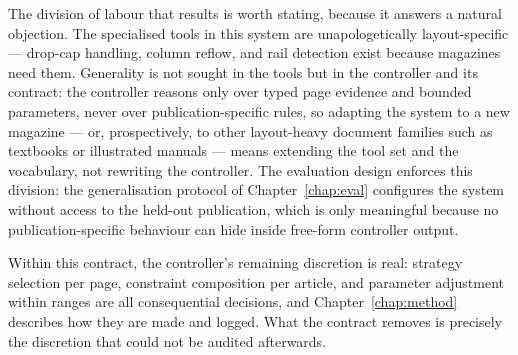 The division of labour that results is worth stating, because it
answers a natural objection. The specialised tools in this system are
unapologetically layout-specific --- drop-cap handling, column reflow,
and rail detection exist because magazines need them. Generality is
not sought in the tools but in the controller and its contract: the
controller reasons only over typed page evidence and bounded
parameters, never over publication-specific rules, so adapting the
system to a new magazine --- or, prospectively, to other layout-heavy
document families such as textbooks or illustrated manuals --- means
extending the tool set and the vocabulary, not rewriting the
controller. The evaluation design enforces this division: the
generalisation protocol of Chapter~\ref{chap:eval} configures the
system without access to the held-out publication, which is only
meaningful because no publication-specific behaviour can hide inside
free-form controller output.

Within this contract, the controller's remaining discretion is real:
strategy selection per page, constraint composition per article, and
parameter adjustment within ranges are all consequential decisions,
and Chapter~\ref{chap:method} describes how they are made and logged.
What the contract removes is precisely the discretion that could not
be audited afterwards.

